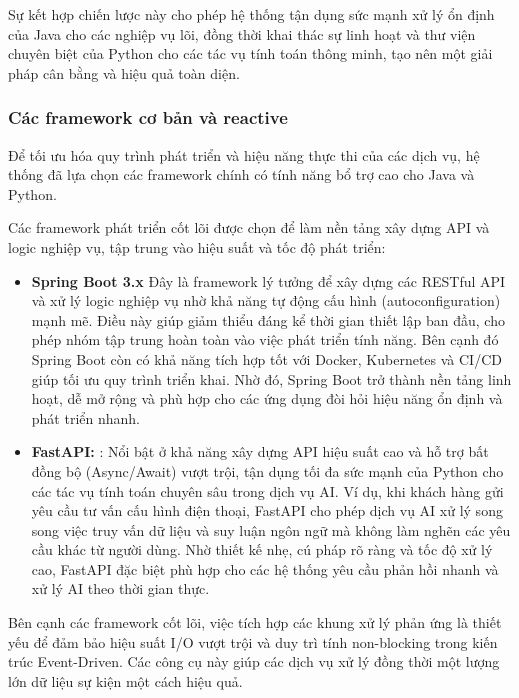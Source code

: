 Sự kết hợp chiến lược này cho phép hệ thống tận dụng sức mạnh xử lý ổn định của Java cho các nghiệp vụ lõi, đồng thời khai thác sự linh hoạt và thư viện chuyên biệt của Python cho các tác vụ tính toán thông minh, tạo nên một giải pháp cân bằng và hiệu quả toàn diện.

\subsubsection{Các framework cơ bản và reactive}

Để tối ưu hóa quy trình phát triển và hiệu năng thực thi của các dịch vụ, hệ thống đã lựa chọn các framework chính có tính năng bổ trợ cao cho Java và Python.

Các framework phát triển cốt lõi được chọn để làm nền tảng xây dựng API và logic nghiệp vụ, tập trung vào hiệu suất và tốc độ phát triển:

\begin{itemize}
    \item \textbf{Spring Boot 3.x\: } Đây là framework lý tưởng để xây dựng các RESTful API và xử lý logic nghiệp vụ nhờ khả năng tự động cấu hình (autoconfiguration) mạnh mẽ. Điều này giúp giảm thiểu đáng kể thời gian thiết lập ban đầu, cho phép nhóm tập trung hoàn toàn vào việc phát triển tính năng. Bên cạnh đó Spring Boot còn có khả năng tích hợp tốt với Docker, Kubernetes và CI/CD giúp tối ưu quy trình triển khai. Nhờ đó, Spring Boot trở thành nền tảng linh hoạt, dễ mở rộng và phù hợp cho các ứng dụng đòi hỏi hiệu năng ổn định và phát triển nhanh.
    \item \textbf{FastAPI: }: Nổi bật ở khả năng xây dựng API hiệu suất cao và hỗ trợ bất đồng bộ (Async/Await) vượt trội, tận dụng tối đa sức mạnh của Python cho các tác vụ tính toán chuyên sâu trong dịch vụ AI. Ví dụ, khi khách hàng gửi yêu cầu tư vấn cấu hình điện thoại, FastAPI cho phép dịch vụ AI xử lý song song việc truy vấn dữ liệu và suy luận ngôn ngữ mà không làm nghẽn các yêu cầu khác từ người dùng. Nhờ thiết kế nhẹ, cú pháp rõ ràng và tốc độ xử lý cao, FastAPI đặc biệt phù hợp cho các hệ thống yêu cầu phản hồi nhanh và xử lý AI theo thời gian thực.
\end{itemize}

Bên cạnh các framework cốt lõi, việc tích hợp các khung xử lý phản ứng là thiết yếu để đảm bảo hiệu suất I/O vượt trội và duy trì tính non-blocking trong kiến trúc Event-Driven. Các công cụ này giúp các dịch vụ xử lý đồng thời một lượng lớn dữ liệu sự kiện một cách hiệu quả.

